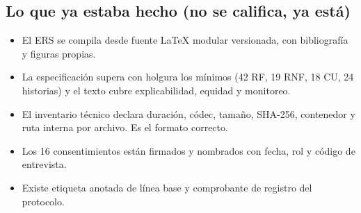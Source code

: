 \documentclass[11pt,a4paper]{article}
\begin{document}
\subsection*{Lo que ya estaba hecho (no se califica, ya está)}
\begin{itemize}
    \item El ERS se compila desde fuente \LaTeX{} modular versionada, con bibliografía y figuras propias.
    \item La especificación supera con holgura los mínimos (42 RF, 19 RNF, 18 CU, 24 historias) y el texto cubre explicabilidad, equidad y monitoreo.
    \item El inventario técnico declara duración, códec, tamaño, SHA-256, contenedor y ruta interna por archivo. Es el formato correcto.
    \item Los 16 consentimientos están firmados y nombrados con fecha, rol y código de entrevista.
    \item Existe etiqueta anotada de línea base y comprobante de registro del protocolo.
\end{itemize}
\end{document}
